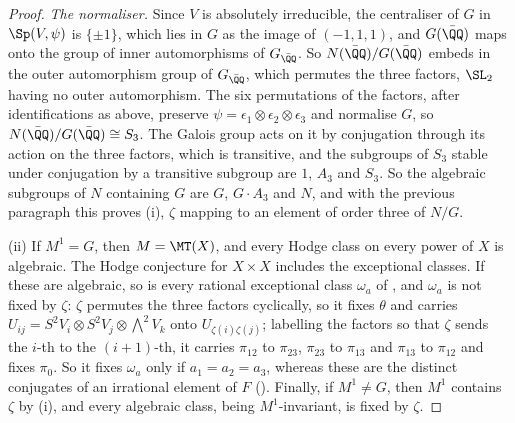 \begin{proof}
\emph{The normaliser.} Since $V$ is absolutely irreducible, the centraliser of
$G$ in $\Sp(V,\psi)$ is $\{\pm1\}$, which lies in $G$ as the image of
$(-1,1,1)$, and $G(\bar{\QQ})$ maps onto the group of inner automorphisms of
$G_{\bar{\QQ}}$. So $N(\bar{\QQ})/G(\bar{\QQ})$ embeds in the outer
automorphism group of $G_{\bar{\QQ}}$, which permutes the three factors,
$\SL_{2}$ having no outer automorphism. The six permutations of the factors,
after identifications as above, preserve $\psi=\epsilon_{1}\otimes
\epsilon_{2}\otimes\epsilon_{3}$ and normalise $G$, so
$N(\bar{\QQ})/G(\bar{\QQ})\cong S_{3}$. The Galois group acts on it by
conjugation through its action on the three factors, which is transitive, and
the subgroups of $S_{3}$ stable under conjugation by a transitive subgroup are
$1$, $A_{3}$ and $S_{3}$. So the algebraic subgroups of $N$ containing $G$ are
$G$, $G\cdot A_{3}$ and $N$, and with the previous paragraph this proves (i),
$\zeta$ mapping to an element of order three of $N/G$.

(ii) If $M^{1}=G$, then $M=\MT(X)$, and every Hodge class on every power of
$X$ is algebraic. The Hodge conjecture for $X\times X$ includes the
exceptional classes. If these are algebraic, so is every rational exceptional
class $\omega_{a}$ of , and $\omega_{a}$ is not fixed by
$\zeta$: $\zeta$ permutes the three factors cyclically, so it fixes $\theta$
and carries $U_{ij}=S^{2}V_{i}\otimes S^{2}V_{j}\otimes{\textstyle\bigwedge^{2}}V_{k}$
onto $U_{\zeta(i)\zeta(j)}$; labelling the factors so that $\zeta$ sends the
$i$-th to the $(i+1)$-th, it carries $\pi_{12}$ to $\pi_{23}$, $\pi_{23}$ to
$\pi_{13}$ and $\pi_{13}$ to $\pi_{12}$ and fixes $\pi_{0}$. So it fixes
$\omega_{a}$ only if $a_{1}=a_{2}=a_{3}$, whereas these are the distinct
conjugates of an irrational element of $F$ (). Finally,
if $M^{1}\ne G$, then $M^{1}$ contains $\zeta$ by (i), and every algebraic
class, being $M^{1}$-invariant, is fixed by $\zeta$.


\end{proof}
